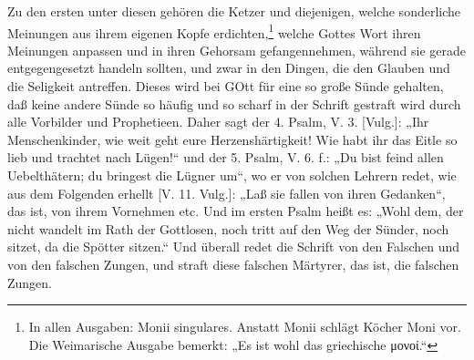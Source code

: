 Zu den ersten unter diesen gehören die Ketzer und diejenigen, welche sonderliche Meinungen aus ihrem eigenen Kopfe erdichten,\footnote{In allen Ausgaben: Monii singulares. Anstatt Monii schlägt Köcher Moni vor. Die Weimarische Ausgabe bemerkt: „Es ist wohl das griechische μονοί.“} welche Gottes Wort ihren Meinungen anpassen und in ihren Gehorsam gefangennehmen, während sie gerade entgegengesetzt handeln sollten, und zwar in den Dingen, die den Glauben und die Seligkeit antreffen. Dieses wird bei GOtt für eine so große Sünde gehalten, daß keine andere Sünde so häufig und so scharf in der Schrift gestraft wird durch alle Vorbilder und Prophetieen. Daher sagt der 4. Psalm, V. 3. [Vulg.]: „Ihr Menschenkinder, wie weit geht eure Herzenshärtigkeit! Wie habt ihr das Eitle so lieb und trachtet nach Lügen!“ und der 5. Psalm, V. 6. f.: „Du bist feind allen Uebelthätern; du bringest die Lügner um“, wo er von solchen Lehrern redet, wie aus dem Folgenden erhellt [V. 11. Vulg.]: „Laß sie fallen von ihren Gedanken“, das ist, von ihrem Vornehmen etc. Und im ersten Psalm heißt es: „Wohl dem, der nicht wandelt im Rath der Gottlosen, noch tritt auf den Weg der Sünder, noch sitzet, da die Spötter sitzen.“ Und überall redet die Schrift von den Falschen und von den falschen Zungen, und straft diese falschen Märtyrer, das ist, die falschen Zungen.

